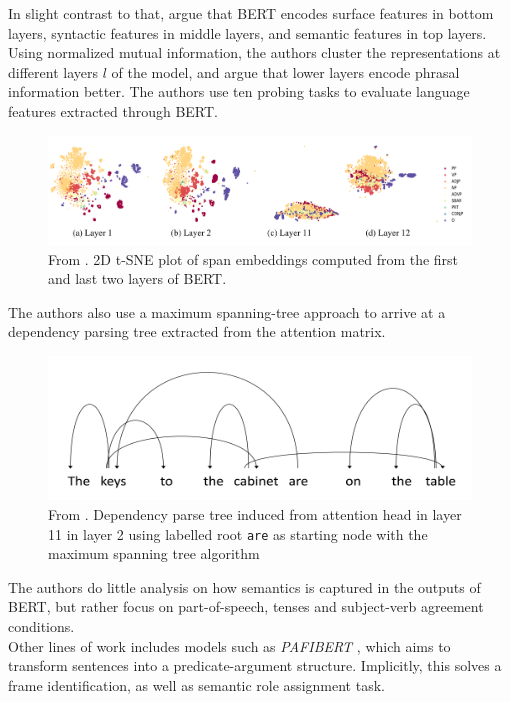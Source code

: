 \documentclass[a4paper,12pt,twoside,openright]{report}
\begin{document}
In slight contrast to that, \cite{jawahar19} argue that BERT encodes surface features in bottom layers, syntactic features in middle layers, and semantic features in top layers.
Using normalized mutual information, the authors cluster the representations at different layers $l$ of the model, and argue that lower layers encode phrasal information better.
The authors use ten probing tasks to evaluate language features extracted through BERT.

\begin{figure}
	\center
  \includegraphics[width=0.9\linewidth]{./assets/relatedwork/BERT_tsne_layers.png}
  \caption{From \cite{jawahar19}. 2D t-SNE plot of span embeddings computed from the first and last two layers of BERT.}
  \label{fig:cold_fictional_desired}
\end{figure}

The authors also use a maximum spanning-tree approach to arrive at a dependency parsing tree extracted from the attention matrix.

\begin{figure}
	\center
  \includegraphics[width=0.7\linewidth]{./assets/relatedwork/BERT_dependency_parsing.png}
  \caption{From \cite{jawahar19}. Dependency parse tree induced from attention head in layer 11 in layer 2 using labelled root \texttt{are} as starting node with the maximum spanning tree algorithm}
  \label{fig:cold_fictional_desired}
\end{figure}

The authors do little analysis on how semantics is captured in the outputs of BERT, but rather focus on part-of-speech, tenses and subject-verb agreement conditions. \\

Other lines of work includes models such as \textit{PAFIBERT} \cite{tan19}, which aims to transform sentences into a predicate-argument structure.
Implicitly, this solves a frame identification, as well as semantic role assignment task. \\
\end{document}
